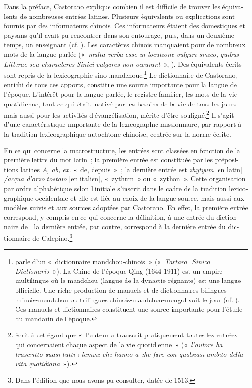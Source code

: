 \documentclass[output=paper,colorlinks,citecolor=brown,arabicfont,chinesefont,booklanguage=french]{langscibook}
\begin{document}
\begin{otherlanguage}{french}
Dans la préface, Castorano explique combien il est difficile de trouver les équivalents de nombreuses entrées latines. Plusieurs équivalents ou explications sont fournis par des informateurs chinois. Ces informateurs étaient des domestiques et paysans qu’il avait pu rencontrer dans son entourage, puis, dans un deuxième temps, un enseignant (cf. \citealt[179]{Li2017}). Les caractères chinois manquaient pour de nombreux mots de la langue parlée («~\emph{multa verba esse in locutione vulgari sinico, quibus Litterae seu characteres Sinici vulgares non occurant}~»,  \citealt[6]{Orazi1732}). Des équivalents écrits sont repris de la lexicographie sino-mandchoue.\footnote{\citet[6]{Orazi1732} parle d’un «~dictionnaire mandchou-chinois~» («~\emph{Tartaro=Sinico Dictionario}~»). La Chine de l’époque Qing (1644-1911) est un empire multilingue où le mandchou (langue de la dynastie régnante) est une langue officielle. Une riche production de manuels et de dictionnaires bilingues chinois-mandchou ou trilingues chinois-mandchou-mongol voit le jour (cf. \citealt{Soderblom_saarela2019}). Ces manuels et dictionnaires constituent une source importante pour l’étude du mandarin de l’époque.} Le dictionnaire de Castorano, enrichi de tous ces apports, constitue une source importante pour la langue de l’époque. L’intérêt pour la langue parlée, le registre familier, les mots de la vie quotidienne, tout ce qui était motivé par les besoins de la vie de tous les jours mais aussi pour les activités d’évangélisation, mérite d’être souligné.\footnote{\citet[183]{Li2017} écrit à cet égard que «~l’auteur a transcrit pratiquement toutes les entrées qui concernaient chaque aspect de la vie quotidienne~» («~\emph{l’autore ha trascritto quasi tutti i lemmi che hanno a che fare con qualsiasi ambito della vita quotidiana}~»).} Il s’agit d’une caractéristique importante de la lexicographie missionnaire, par rapport à la tradition lexicographique autochtone chinoise, centrée sur la norme écrite.

En ce qui concerne la macrostructure, les entrées sont classées en fonction de la première lettre du mot latin~; la première entrée est constituée par les prépositions latines \emph{A, ab, ex.} «~de, depuis~»~; la dernière entrée est \emph{zhytyum} [en latin] \emph{/acqua d’orzo tostato} [en italien], «~zythum~» ou «~zython~». Cette organisation par ordre alphabétique selon l’initiale s’inscrit dans le cadre de la tradition lexicographique occidentale et elle est liée au choix de la langue source, mais aussi aux modèles suivis et aux sources adoptées par Castorano. En effet, la première entrée correspond, y compris en ce qui concerne la définition, à une entrée du dictionnaire de \citet[12]{Calderino1586}; la dernière entrée, par contre, correspond à la dernière entrée du dictionnaire de Calepino.\footnote{Dans l’édition que nous avons pu consulter, datée de 1513.} 


\end{otherlanguage}
\end{document}
